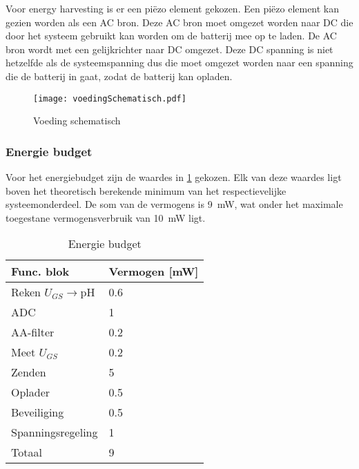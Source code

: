 Voor energy harvesting is er een piëzo element gekozen. Een piëzo element kan gezien worden als een AC bron. Deze AC bron moet omgezet worden naar DC die door het systeem gebruikt kan worden om de batterij mee op te laden. De AC bron wordt met een gelijkrichter naar DC omgezet. Deze DC spanning is niet hetzelfde als de systeemspanning dus die moet omgezet worden naar een spanning die de batterij in gaat, zodat de batterij kan opladen.

\begin{figure}[!htbp]
    \centering
    \texttt{[image: voedingSchematisch.pdf]}
    \caption{Voeding schematisch}
    \label{fig:voedingSchematisch}
\end{figure}



\subsubsection{Energie budget}\label{sec:energyBudgets}
Voor het energiebudget zijn de waardes in \cref{tab:energieBudgetEstimatie} gekozen. Elk van deze waardes ligt boven het theoretisch berekende minimum van het respectievelijke systeemonderdeel. De som van de vermogens is \qty{9}{\milli\watt}, wat onder het maximale toegestane vermogensverbruik van \qty{10}{\milli\watt} ligt.


\begin{table}[!htbp]
    \centering
    \begin{tabular}{l|l}
        Func. blok          & Vermogen [mW] \\
        \hline
        Reken $U_{GS}\rightarrow$pH & 0.6   \\
        ADC                 & 1             \\
        AA-filter           & 0.2           \\
        Meet $U_{GS}$       & 0.2           \\
        Zenden              & 5             \\
        Oplader             & 0.5           \\
        Beveiliging         & 0.5           \\
        Spanningsregeling   & 1             \\
        \hline
        \hline
        Totaal              & 9

    \end{tabular}
    \caption{Energie budget}
    \label{tab:energieBudgetEstimatie}
\end{table}


